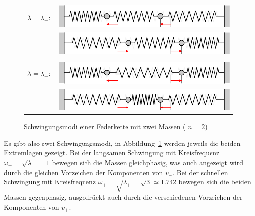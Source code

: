 \begin{figure}
\begin{center}
\begin{tabular}{ll}
$\lambda=\lambda_-:$&%
\includegraphics{images/e-4}\\%
&\includegraphics{images/e-5}\\%
\\
$\lambda=\lambda_+:$&%
\includegraphics{images/e-2}\\%
&\includegraphics{images/e-3}%
\end{tabular}
\end{center}
\caption{Schwingungsmodi einer Federkette mit zwei Massen ( $n=2$)\label{n2modi}}
\end{figure}%
Es gibt also zwei Schwingungsmodi, in
Abbildung~\ref{n2modi} werden jeweils die beiden Extremlagen 
gezeigt.
Bei der langsamen Schwingung mit Kreisfrequenz
$\omega_-=\sqrt{\lambda_-}=1$ bewegen sich die Massen gleichphasig,
was auch angezeigt wird durch die gleichen Vorzeichen
der Komponenten von $v_-$.
Bei der schnellen Schwingung mit Kreisfrequenz
$\omega_+=\sqrt{\lambda_+}=\sqrt{3}\simeq 1.732$ bewegen sich die 
beiden Massen gegenphasig, ausgedrückt auch durch
die verschiedenen Vorzeichen der Komponenten von $v_+$.

